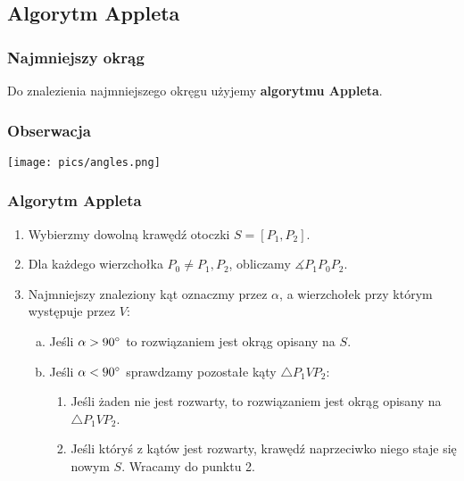 \documentclass{beamer}
\begin{document}
\subsection{Algorytm Appleta}

\begin{frame}
\frametitle{Najmniejszy okrąg}
\begin{center}
Do znalezienia najmniejszego okręgu użyjemy \textbf{algorytmu Appleta}.
\end{center}

\end{frame}


\begin{frame}
\frametitle{Obserwacja}
\begin{center}
\texttt{[image: pics/angles.png]}
\end{center}

\end{frame}


\begin{frame}

\frametitle{Algorytm Appleta}

\begin{enumerate}[1.]

\item Wybierzmy dowolną krawędź otoczki $S  = [P_1, P_2]$.

\item Dla każdego wierzchołka $P_0 \neq P_1, P_2$, 
obliczamy $ \measuredangle P_1 P_0 P_2 $. 

\item Najmniejszy znaleziony kąt oznaczmy przez $\alpha$, 
a wierzchołek przy którym występuje przez $V$:

\begin{enumerate}[a)]

\item Jeśli $ \alpha > 90 \degree $ to rozwiązaniem jest okrąg opisany na $S$. 
\item  Jeśli $ \alpha < 90 \degree $ sprawdzamy pozostałe 
kąty $ \triangle P_1 V P_2 $:

\begin{enumerate}[-]
\item  Jeśli żaden nie jest rozwarty, to rozwiązaniem 
jest okrąg opisany na $ \triangle P_1 V P_2 $.

\item Jeśli któryś z kątów jest rozwarty, krawędź naprzeciwko niego
staje się nowym $S$. Wracamy do punktu 2.

\end{enumerate}

\end{enumerate}

\end{enumerate}

\end{frame}
\end{document}
